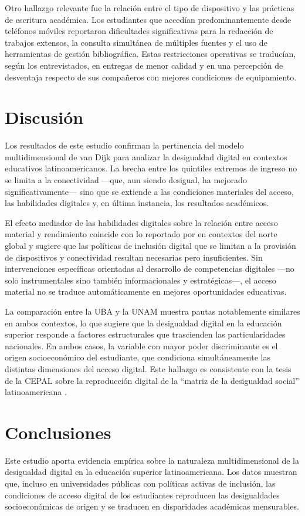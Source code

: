 Otro hallazgo relevante fue la relación entre el tipo de dispositivo y las prácticas de escritura académica. Los estudiantes que accedían predominantemente desde teléfonos móviles reportaron dificultades significativas para la redacción de trabajos extensos, la consulta simultánea de múltiples fuentes y el uso de herramientas de gestión bibliográfica. Estas restricciones operativas se traducían, según los entrevistados, en entregas de menor calidad y en una percepción de desventaja respecto de sus compañeros con mejores condiciones de equipamiento.


\section{Discusión}
Los resultados de este estudio confirman la pertinencia del modelo multidimensional de van Dijk \autocite*{2563-VANDIJK2020} para analizar la desigualdad digital en contextos educativos latinoamericanos. La brecha entre los quintiles extremos de ingreso no se limita a la conectividad —que, aun siendo desigual, ha mejorado significativamente— sino que se extiende a las condiciones materiales del acceso, las habilidades digitales y, en última instancia, los resultados académicos.

El efecto mediador de las habilidades digitales sobre la relación entre acceso material y rendimiento coincide con lo reportado por \autocite{2565-HARGITTAI2002} en contextos del norte global y sugiere que las políticas de inclusión digital que se limitan a la provisión de dispositivos y conectividad resultan necesarias pero insuficientes. Sin intervenciones específicas orientadas al desarrollo de competencias digitales —no solo instrumentales sino también informacionales y estratégicas—, el acceso material no se traduce automáticamente en mejores oportunidades educativas.

La comparación entre la UBA y la UNAM muestra pautas notablemente similares en ambos contextos, lo que sugiere que la desigualdad digital en la educación superior responde a factores estructurales que trascienden las particularidades nacionales. En ambos casos, la variable con mayor poder discriminante es el origen socioeconómico del estudiante, que condiciona simultáneamente las distintas dimensiones del acceso digital. Este hallazgo es consistente con la tesis de la CEPAL sobre la reproducción digital de la “matriz de la desigualdad social” latinoamericana \autocite{2566-CEPAL2021}.


\section{Conclusiones}
Este estudio aporta evidencia empírica sobre la naturaleza multidimensional de la desigualdad digital en la educación superior latinoamericana. Los datos muestran que, incluso en universidades públicas con políticas activas de inclusión, las condiciones de acceso digital de los estudiantes reproducen las desigualdades socioeconómicas de origen y se traducen en disparidades académicas mensurables.

